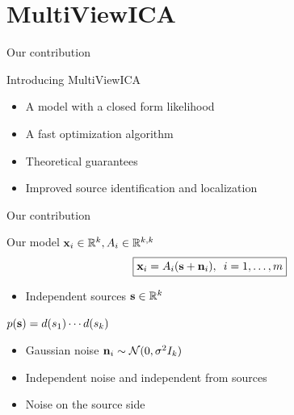 \documentclass[bigger]{beamer}
\begin{document}
\section{MultiViewICA}
\label{sec:orgb958ef1}
\begin{frame}[label={sec:org65dfcba}]{Our contribution}
\begin{block}{Introducing MultiViewICA}
\begin{itemize}
\item A model with a closed form likelihood
\item A fast optimization algorithm
\item Theoretical guarantees
\item Improved source identification and localization
\end{itemize}
\end{block}
\end{frame}

\begin{frame}[label={sec:org10fe18b}]{Our contribution}
\begin{block}{Our model}
\(\mathbf{x}_i \in \mathbb{R}^k, A_i \in \mathbb{R}^{k, k}\)
\begin{equation}
\boxed{
    \mathbf{x}_i = A_i(\mathbf{s} + \mathbf{n}_i), \enspace i=1,\dots, m
    }
\end{equation}

\begin{itemize}
\item Independent sources \(\mathbf{s} \in \mathbb{R}^k\)
\end{itemize}
\(p(\mathbf{s}) = d(s_1) \cdots d(s_k)\)
\begin{itemize}
\item Gaussian noise \(\mathbf{n}_i \sim \mathcal{N}(0, \sigma^2 I_k)\)
\item Independent noise and independent from sources
\item Noise on the source side
\end{itemize}
\end{block}
\end{frame}
\end{document}
